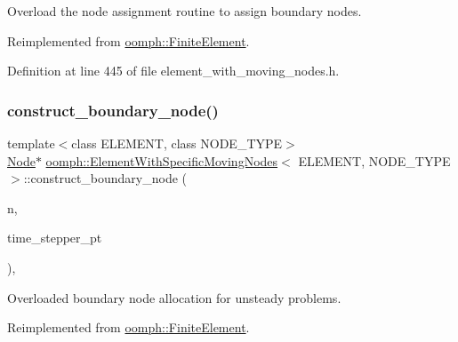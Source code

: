 Overload the node assignment routine to assign boundary nodes. 



Reimplemented from \hyperlink{classoomph_1_1FiniteElement_ac6f9b6635daf3bfca24adb2c22c8dc81}{oomph\+::\+Finite\+Element}.



Definition at line 445 of file element\+\_\+with\+\_\+moving\+\_\+nodes.\+h.

\mbox{\label{classoomph_1_1ElementWithSpecificMovingNodes_ad76d54eac2934b61bc99a4069c493484}} 
\subsubsection{\texorpdfstring{construct\+\_\+boundary\+\_\+node()}{construct\_boundary\_node()}\hspace{0.1cm}{\footnotesize\ttfamily [2/2]}}
{\footnotesize\ttfamily template$<$class E\+L\+E\+M\+E\+NT, class N\+O\+D\+E\+\_\+\+T\+Y\+PE$>$ \\
\hyperlink{classoomph_1_1Node}{Node}$\ast$ \hyperlink{classoomph_1_1ElementWithSpecificMovingNodes}{oomph\+::\+Element\+With\+Specific\+Moving\+Nodes}$<$ E\+L\+E\+M\+E\+NT, N\+O\+D\+E\+\_\+\+T\+Y\+PE $>$\+::construct\+\_\+boundary\+\_\+node (\begin{DoxyParamCaption}\item[{const unsigned \&}]{n,  }\item[{\hyperlink{classoomph_1_1TimeStepper}{Time\+Stepper} $\ast$const \&}]{time\+\_\+stepper\+\_\+pt }\end{DoxyParamCaption})\hspace{0.3cm}{\ttfamily [inline]}, {\ttfamily [virtual]}}



Overloaded boundary node allocation for unsteady problems. 



Reimplemented from \hyperlink{classoomph_1_1FiniteElement_ae49607dfdff1f24e9857d5b93d2ebf67}{oomph\+::\+Finite\+Element}.



